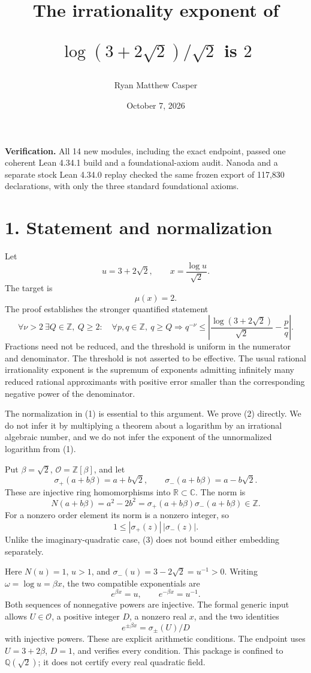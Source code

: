 \documentclass[11pt]{article}
\title{The irrationality exponent of\par $\log(3+2\sqrt{2})/\sqrt{2}$ is $2$}
\author{Ryan Matthew Casper}
\date{October 7, 2026}
\begin{document}
\maketitle
\textbf{Verification.} All 14 new modules, including the exact endpoint,
passed one coherent Lean 4.34.1 build and a foundational-axiom audit.
Nanoda and a separate stock Lean 4.34.0 replay checked the same frozen
export of 117,830 declarations, with only the three standard
foundational axioms.

\section{1. Statement and
normalization}\label{statement-and-normalization}

Let \[
u=3+2\sqrt2,\qquad x=\frac{\log u}{\sqrt2}.
\] The target is \[
\mu(x)=2.
\tag{1}
\] The proof establishes the stronger quantified statement \[
\forall\nu>2\ \exists Q\in\mathbb Z,\ Q\ge2:\quad
\forall p,q\in\mathbb Z,\ q\ge Q\Longrightarrow
q^{-\nu}\le\left|\frac{\log(3+2\sqrt2)}{\sqrt2}-\frac pq\right|.
\tag{2}
\] Fractions need not be reduced, and the threshold is uniform in the
numerator and denominator. The threshold is not asserted to be
effective. The usual rational irrationality exponent is the supremum of
exponents admitting infinitely many reduced rational approximants with
positive error smaller than the corresponding negative power of the
denominator.

The normalization in (1) is essential to this argument. We prove (2)
directly. We do not infer it by multiplying a theorem about a logarithm
by an irrational algebraic number, and we do not infer the exponent of
the unnormalized logarithm from (1).

Put \(\beta=\sqrt2\), \(\mathcal O=\mathbb Z[\beta]\), and let \[
\sigma_+(a+b\beta)=a+b\sqrt2,\qquad
\sigma_-(a+b\beta)=a-b\sqrt2.
\] These are injective ring homomorphisms into
\(\mathbb R\subset\mathbb C\). The norm is \[
N(a+b\beta)=a^2-2b^2=\sigma_+(a+b\beta)\sigma_-(a+b\beta)\in\mathbb Z.
\] For a nonzero order element its norm is a nonzero integer, so \[
1\le |\sigma_+(z)|\,|\sigma_-(z)|.
\tag{3}
\] Unlike the imaginary-quadratic case, (3) does not bound either
embedding separately.

Here \(N(u)=1\), \(u>1\), and \(\sigma_-(u)=3-2\sqrt2=u^{-1}>0\).
Writing \(\omega=\log u=\beta x\), the two compatible exponentials are
\[
e^{\beta x}=u,\qquad e^{-\beta x}=u^{-1}.
\tag{4}
\] Both sequences of nonnegative powers are injective. The formal
generic input allows \(U\in\mathcal O\), a positive integer \(D\), a
nonzero real \(x\), and the two identities \[
e^{\pm\beta x}=\sigma_\pm(U)/D
\tag{5}
\] with injective powers. These are explicit arithmetic conditions. The
endpoint uses \(U=3+2\beta\), \(D=1\), and verifies every condition.
This package is confined to \(\mathbb Q(\sqrt2)\); it does not certify
every real quadratic field.
\end{document}
